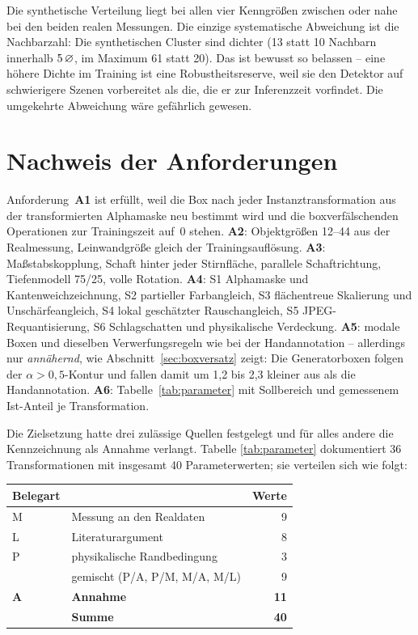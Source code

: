 Die synthetische Verteilung liegt bei allen vier Kenngrößen zwischen oder nahe
bei den beiden realen Messungen. Die einzige systematische Abweichung ist die
Nachbarzahl: Die synthetischen Cluster sind dichter (13 statt 10 Nachbarn
innerhalb $5\,\varnothing$, im Maximum 61 statt 20). Das ist bewusst so belassen -- eine
höhere Dichte im Training ist eine Robustheitsreserve, weil sie den Detektor auf
schwierigere Szenen vorbereitet als die, die er zur Inferenzzeit vorfindet. Die
umgekehrte Abweichung wäre gefährlich gewesen.

\section{Nachweis der Anforderungen}
\label{sec:nachweis}

Anforderung~\textbf{A1} ist erfüllt, weil die Box nach jeder
Instanztransformation aus der transformierten Alphamaske neu bestimmt wird und
die boxverfälschenden Operationen zur Trainingszeit auf~0 stehen.
\textbf{A2}: Objektgrößen 12--44\px{} aus der Realmessung, Leinwandgröße gleich
der Trainingsauflösung. \textbf{A3}: Maßstabskopplung, Schaft hinter jeder
Stirnfläche, parallele Schaftrichtung, Tiefenmodell 75/25, volle Rotation.
\textbf{A4}: S1 Alphamaske und Kantenweichzeichnung, S2 partieller Farbangleich,
S3 flächentreue Skalierung und Unschärfeangleich, S4 lokal geschätzter
Rauschangleich, S5 JPEG-Requantisierung, S6 Schlagschatten und physikalische
Verdeckung. \textbf{A5}: modale Boxen und dieselben Verwerfungsregeln wie bei der
Handannotation -- allerdings nur \emph{annähernd}, wie
Abschnitt~\ref{sec:boxversatz} zeigt: Die Generatorboxen folgen der
$\alpha > 0{,}5$-Kontur und fallen damit um 1,2 bis 2,3\px{} kleiner aus als die
Handannotation. \textbf{A6}: Tabelle~\ref{tab:parameter} mit Sollbereich und
gemessenem Ist-Anteil je Transformation.

 Die Zielsetzung hatte drei zulässige Quellen
festgelegt und für alles andere die Kennzeichnung als Annahme verlangt. Tabelle
\ref{tab:parameter} dokumentiert 36 Transformationen mit insgesamt 40
Parameterwerten; sie verteilen sich wie folgt:

\begin{center}\footnotesize
\begin{tabular}{@{}llr@{}}
\toprule
\textbf{Belegart} & & \textbf{Werte} \\
\midrule
M & Messung an den Realdaten          &  9 \\
L & Literaturargument                 &  8 \\
P & physikalische Randbedingung       &  3 \\
    & gemischt (P/A, P/M, M/A, M/L)   &  9 \\
\textbf{A} & \textbf{Annahme}         & \textbf{11} \\
\midrule
    & \textbf{Summe}                  & \textbf{40} \\
\bottomrule
\end{tabular}
\end{center}

